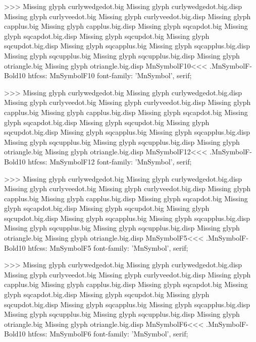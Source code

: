 >>>
Missing glyph	curlywedgedot.big
Missing glyph	curlywedgedot.big.disp
Missing glyph	curlyveedot.big
Missing glyph	curlyveedot.big.disp
Missing glyph	capplus.big
Missing glyph	capplus.big.disp
Missing glyph	sqcapdot.big
Missing glyph	sqcapdot.big.disp
Missing glyph	sqcupdot.big
Missing glyph	sqcupdot.big.disp
Missing glyph	sqcapplus.big
Missing glyph	sqcapplus.big.disp
Missing glyph	sqcupplus.big
Missing glyph	sqcupplus.big.disp
Missing glyph	otriangle.big
Missing glyph	otriangle.big.disp
\<MnSymbolF10\><<<
.MnSymbolF-Bold10
htfcss:  MnSymbolF10  font-family: 'MnSymbol', serif;

>>>
Missing glyph	curlywedgedot.big
Missing glyph	curlywedgedot.big.disp
Missing glyph	curlyveedot.big
Missing glyph	curlyveedot.big.disp
Missing glyph	capplus.big
Missing glyph	capplus.big.disp
Missing glyph	sqcapdot.big
Missing glyph	sqcapdot.big.disp
Missing glyph	sqcupdot.big
Missing glyph	sqcupdot.big.disp
Missing glyph	sqcapplus.big
Missing glyph	sqcapplus.big.disp
Missing glyph	sqcupplus.big
Missing glyph	sqcupplus.big.disp
Missing glyph	otriangle.big
Missing glyph	otriangle.big.disp
\<MnSymbolF12\><<<
.MnSymbolF-Bold10
htfcss:  MnSymbolF12  font-family: 'MnSymbol', serif;

>>>
Missing glyph	curlywedgedot.big
Missing glyph	curlywedgedot.big.disp
Missing glyph	curlyveedot.big
Missing glyph	curlyveedot.big.disp
Missing glyph	capplus.big
Missing glyph	capplus.big.disp
Missing glyph	sqcapdot.big
Missing glyph	sqcapdot.big.disp
Missing glyph	sqcupdot.big
Missing glyph	sqcupdot.big.disp
Missing glyph	sqcapplus.big
Missing glyph	sqcapplus.big.disp
Missing glyph	sqcupplus.big
Missing glyph	sqcupplus.big.disp
Missing glyph	otriangle.big
Missing glyph	otriangle.big.disp
\<MnSymbolF5\><<<
.MnSymbolF-Bold10
htfcss:  MnSymbolF5  font-family: 'MnSymbol', serif;

>>>
Missing glyph	curlywedgedot.big
Missing glyph	curlywedgedot.big.disp
Missing glyph	curlyveedot.big
Missing glyph	curlyveedot.big.disp
Missing glyph	capplus.big
Missing glyph	capplus.big.disp
Missing glyph	sqcapdot.big
Missing glyph	sqcapdot.big.disp
Missing glyph	sqcupdot.big
Missing glyph	sqcupdot.big.disp
Missing glyph	sqcapplus.big
Missing glyph	sqcapplus.big.disp
Missing glyph	sqcupplus.big
Missing glyph	sqcupplus.big.disp
Missing glyph	otriangle.big
Missing glyph	otriangle.big.disp
\<MnSymbolF6\><<<
.MnSymbolF-Bold10
htfcss:  MnSymbolF6  font-family: 'MnSymbol', serif;

